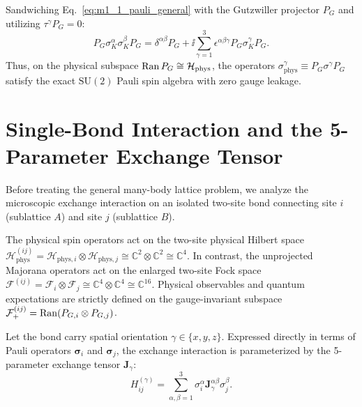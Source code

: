 Sandwiching Eq.~\eqref{eq:m1_1_pauli_general} with the Gutzwiller projector $P_G$ and utilizing $\tau^\gamma P_G = 0$:
\begin{equation}
\label{eq:m1_1_projected_pauli}
P_G \sigma_K^\alpha \sigma_K^\beta P_G = \delta^{\alpha\beta} P_G + \ii \sum_{\gamma=1}^3 \epsilon^{\alpha\beta\gamma} P_G \sigma_K^\gamma P_G.
\end{equation}
Thus, on the physical subspace $\operatorname{Ran} P_G \cong \mathcal{H}_{\mathrm{phys}}$, the operators $\sigma_{\mathrm{phys}}^\gamma \equiv P_G \sigma^\gamma P_G$ satisfy the exact $\mathrm{SU}(2)$ Pauli spin algebra with zero gauge leakage.

\section{Single-Bond Interaction and the 5-Parameter Exchange Tensor}
\label{sec:m1_1_single_bond}
Before treating the general many-body lattice problem, we analyze the microscopic exchange interaction on an isolated two-site bond connecting site $i$ (sublattice $A$) and site $j$ (sublattice $B$).

\begin{remark}
\label{rem:m1_1_bond_hilbert_space}
The physical spin operators act on the two-site physical Hilbert space $\mathcal{H}_{\mathrm{phys}}^{(ij)} = \mathcal{H}_{\mathrm{phys}, i} \otimes \mathcal{H}_{\mathrm{phys}, j} \cong \mathbb{C}^2 \otimes \mathbb{C}^2 \cong \mathbb{C}^4$. In contrast, the unprojected Majorana operators act on the enlarged two-site Fock space $\mathcal{F}^{(ij)} = \mathcal{F}_i \otimes \mathcal{F}_j \cong \mathbb{C}^4 \otimes \mathbb{C}^4 \cong \mathbb{C}^{16}$. Physical observables and quantum expectations are strictly defined on the gauge-invariant subspace $\mathcal{F}_+^{(ij)} = \operatorname{Ran}(P_{G, i} \otimes P_{G, j})$.
\end{remark}

Let the bond carry spatial orientation $\gamma \in \{x, y, z\}$. Expressed directly in terms of Pauli operators $\bm{\sigma}_i$ and $\bm{\sigma}_j$, the exchange interaction is parameterized by the 5-parameter exchange tensor $\mathbf{J}_\gamma$:
\begin{equation}
\label{eq:m1_1_single_bond_H}
H_{ij}^{(\gamma)} = \sum_{\alpha, \beta = 1}^3 \sigma_i^\alpha \mathbf{J}_\gamma^{\alpha\beta} \sigma_j^\beta.
\end{equation}

